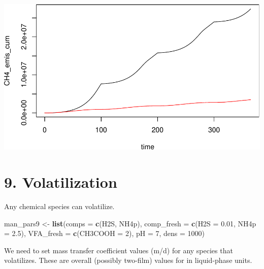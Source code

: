 \documentclass[
]{article}
\newenvironment{Shaded}{\begin{snugshade}}{\end{snugshade}}
\newcommand{\AttributeTok}[1]{\textcolor[rgb]{0.13,0.29,0.53}{#1}}
\newcommand{\DecValTok}[1]{\textcolor[rgb]{0.00,0.00,0.81}{#1}}
\newcommand{\FloatTok}[1]{\textcolor[rgb]{0.00,0.00,0.81}{#1}}
\newcommand{\FunctionTok}[1]{\textcolor[rgb]{0.13,0.29,0.53}{\textbf{#1}}}
\newcommand{\NormalTok}[1]{#1}
\newcommand{\OtherTok}[1]{\textcolor[rgb]{0.56,0.35,0.01}{#1}}
\newcommand{\StringTok}[1]{\textcolor[rgb]{0.31,0.60,0.02}{#1}}
\begin{document}
\includegraphics{simple_demo_files/figure-latex/unnamed-chunk-59-2.pdf}

\hypertarget{volatilization}{%
\section{9. Volatilization}\label{volatilization}}

Any chemical species can volatilize.

\begin{Shaded}
\begin{Highlighting}[]
\NormalTok{man\_pars9 }\OtherTok{\textless{}{-}} \FunctionTok{list}\NormalTok{(}\AttributeTok{comps =} \FunctionTok{c}\NormalTok{(}\StringTok{\textquotesingle{}H2S\textquotesingle{}}\NormalTok{, }\StringTok{\textquotesingle{}NH4p\textquotesingle{}}\NormalTok{),}
                 \AttributeTok{comp\_fresh =} \FunctionTok{c}\NormalTok{(}\AttributeTok{H2S =} \FloatTok{0.01}\NormalTok{, }\AttributeTok{NH4p =} \FloatTok{2.5}\NormalTok{), }
                 \AttributeTok{VFA\_fresh =} \FunctionTok{c}\NormalTok{(}\AttributeTok{CH3COOH =} \DecValTok{2}\NormalTok{),}
                 \AttributeTok{pH =} \DecValTok{7}\NormalTok{, }\AttributeTok{dens =} \DecValTok{1000}\NormalTok{)}
\end{Highlighting}
\end{Shaded}

We need to set mass transfer coefficient values (m/d) for any species
that volatilizes. These are overall (possibly two-film) values for in
liquid-phase units.
\end{document}
